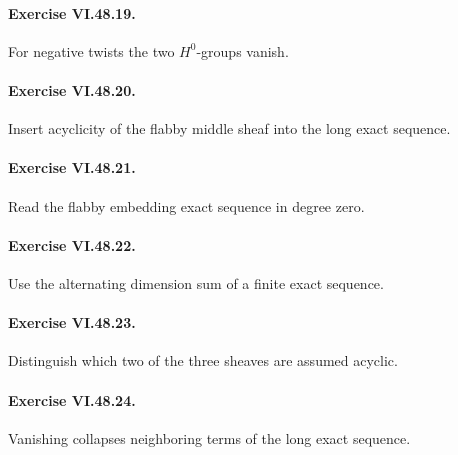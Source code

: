 \paragraph{Exercise VI.48.19.}
\begin{hint}
For negative twists the two \(H^0\)-groups vanish.
\end{hint}

\paragraph{Exercise VI.48.20.}
\begin{hint}
Insert acyclicity of the flabby middle sheaf into the long exact sequence.
\end{hint}

\paragraph{Exercise VI.48.21.}
\begin{hint}
Read the flabby embedding exact sequence in degree zero.
\end{hint}

\paragraph{Exercise VI.48.22.}
\begin{hint}
Use the alternating dimension sum of a finite exact sequence.
\end{hint}

\paragraph{Exercise VI.48.23.}
\begin{hint}
Distinguish which two of the three sheaves are assumed acyclic.
\end{hint}

\paragraph{Exercise VI.48.24.}
\begin{hint}
Vanishing collapses neighboring terms of the long exact sequence.
\end{hint}
